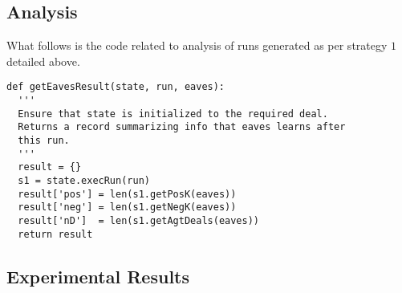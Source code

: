 \subsection{Analysis}
\label{apdx:s1Analysis}

What follows is the code related to analysis of
runs generated as per strategy $1$ detailed above.

\begin{verbatim}
def getEavesResult(state, run, eaves):
  '''
  Ensure that state is initialized to the required deal.
  Returns a record summarizing info that eaves learns after
  this run.
  '''
  result = {}
  s1 = state.execRun(run)
  result['pos'] = len(s1.getPosK(eaves))
  result['neg'] = len(s1.getNegK(eaves))
  result['nD']  = len(s1.getAgtDeals(eaves))
  return result
\end{verbatim}

\subsection{Experimental Results}
\label{appdx:exec}
